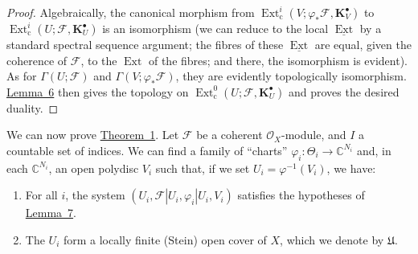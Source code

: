 \documentclass[british]{article}
\providecommand{\tightlist}{%
\setlength{\itemsep}{0pt}\setlength{\parskip}{0pt}}
\newcommand{\oldpage}[1]{\marginpar{\footnotesize$\Big\vert$ \textit{p.~#1}}}
\begin{document}
\begin{proof}
Algebraically, the canonical morphism from
\(\operatorname{Ext}_\mathrm{c}^i(V;\varphi_*{\mathscr{F}},\mathbf{K}_V^\bullet)\)
to
\(\operatorname{Ext}_\mathrm{c}^i(U;{\mathscr{F}},\mathbf{K}_U^\bullet)\)
is an isomorphism (we can reduce to the local
\(\underline{\operatorname{Ext}}\) by a standard spectral sequence
argument; the fibres of these \(\underline{\operatorname{Ext}}\) are
equal, given the coherence of \({\mathscr{F}}\), to the
\(\operatorname{Ext}\) of the fibres; and there, the isomorphism is
evident). As for \(\Gamma(U;{\mathscr{F}})\) and
\(\Gamma(V;\varphi_*{\mathscr{F}})\), they are evidently topologically
isomorphism. \hyperref[lemma-6]{Lemma~6} then gives the topology on
\(\operatorname{Ext}_\mathrm{c}^0(U;{\mathscr{F}},\mathbf{K}_U^\bullet)\)
and proves the desired duality.
\end{proof}

\oldpage{82}

We can now prove \hyperref[theorem-1]{Theorem~1}. Let \({\mathscr{F}}\)
be a coherent \({\mathscr{O}}_X\)-module, and \(I\) a countable set of
indices. We can find a family of ``charts''
\(\varphi_i\colon\Theta_i\to\mathbb{C}^{N_i}\) and, in each
\(\mathbb{C}^{N_i}\), an open polydisc \(V_i\) such that, if we set
\(U_i=\varphi^{-1}(V_i)\), we have:

\begin{enumerate}
\def\labelenumi{\arabic{enumi}.}
\tightlist
\item
  For all \(i\), the system
  \((U_i, {\mathscr{F}}|U_i, \varphi_i|U_i,V_i)\) satisfies the
  hypotheses of \hyperref[lemma-7]{Lemma~7}.
\item
  The \(U_i\) form a locally finite (Stein) open cover of \(X\), which
  we denote by \({\mathfrak{U}}\).
\end{enumerate}
\end{document}
